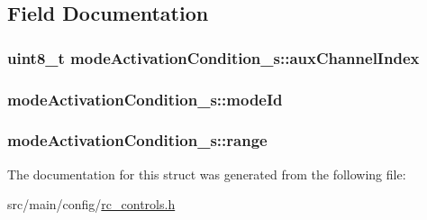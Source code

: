 \subsection{Field Documentation}
\hypertarget{structmodeActivationCondition__s_a2a0fe45d4472aa10276147f13a86b620}{
\subsubsection[{aux\+Channel\+Index}]{\setlength{\rightskip}{0pt plus 5cm}uint8\+\_\+t mode\+Activation\+Condition\+\_\+s\+::aux\+Channel\+Index}}\label{structmodeActivationCondition__s_a2a0fe45d4472aa10276147f13a86b620}
\hypertarget{structmodeActivationCondition__s_a328a6eef1426aae906042b91c9f5c561}{
\subsubsection[{mode\+Id}]{ mode\+Activation\+Condition\+\_\+s\+::mode\+Id}}\label{structmodeActivationCondition__s_a328a6eef1426aae906042b91c9f5c561}
\hypertarget{structmodeActivationCondition__s_a9f5fc943f64e15a98e0886332b4db9da}{
\subsubsection[{range}]{ mode\+Activation\+Condition\+\_\+s\+::range}}\label{structmodeActivationCondition__s_a9f5fc943f64e15a98e0886332b4db9da}


The documentation for this struct was generated from the following file\+:\begin{DoxyCompactItemize}
\item 
src/main/config/\hyperlink{rc__controls_8h}{rc\+\_\+controls.\+h}\end{DoxyCompactItemize}
